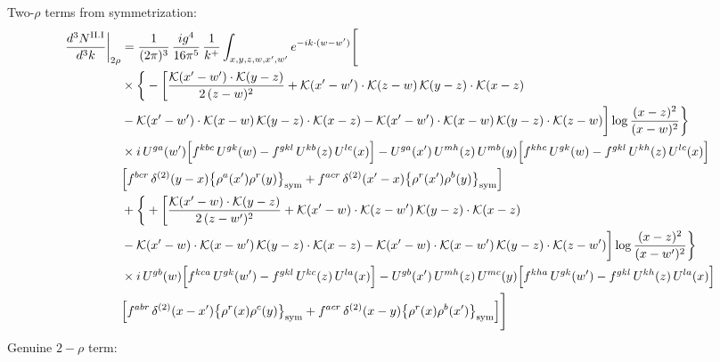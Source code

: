 \documentclass[9pt]{article}
\numberwithin{equation}{section}
\begin{document}
Two-$\rho$ terms from symmetrization: 
\begin{align}
\frac{d^{3}N^{\rm II.I}}{d^{3}k}\bigg|_{2\rho}&=\frac{1}{(2\pi)^{3}}\,\frac{ig^{4}}{16\pi^{5}}\,\frac{1}{k^{+}}\int_{x,y,z,w,x',w'}e^{-ik\cdot{(w-w')}}\Bigg[\notag\\
&\times\bigg\{-\bigg[\frac{\mathcal{K}(x'-w')\cdot\mathcal{K}(y-z)}{2\,(z-w)^{2}}+\mathcal{K}(x'-w')\cdot\mathcal{K}(z-w)\,\mathcal{K}(y-z)\cdot\mathcal{K}(x-z)\notag\\
&-\mathcal{K}(x'-w')\cdot\mathcal{K}(x-w)\,\mathcal{K}(y-z)\cdot\mathcal{K}(x-z)-\mathcal{K}(x'-w')\cdot\mathcal{K}(x-w)\,\mathcal{K}(y-z)\cdot\mathcal{K}(z-w)\bigg]\log\frac{(x-z)^{2}}{(x-w)^{2}}\bigg\}\notag\\
&\times i\,U^{ga}(w')\Big[f^{kbc}\,U^{gk}(w)-f^{gkl}\,U^{kb}(z)\,U^{lc}(x)\Big]-U^{ga}(x')\,U^{mh}(z)\,U^{mb}(y)\Big[f^{khc}\,U^{gk}(w)-f^{gkl}\,U^{kh}(z)\,U^{lc}(x)\Big]\notag \\ & \Big[f^{bcr}\,\delta^{(2)}(y-x)\big\{\rho^{a}(x')\rho^{r}(y)\big\}_{\rm sym} +f^{acr}\,\delta^{(2)}(x'-x)\big\{\rho^{r}(x')\rho^{b}(y)\big\}_{\rm sym}\Big]\notag\\
&+\bigg\{+\bigg[\frac{\mathcal{K}(x'-w)\cdot\mathcal{K}(y-z)}{2\,(z-w')^{2}}+\mathcal{K}(x'-w)\cdot\mathcal{K}(z-w')\,\mathcal{K}(y-z)\cdot\mathcal{K}(x-z)\notag\\
&-\mathcal{K}(x'-w)\cdot\mathcal{K}(x-w')\,\mathcal{K}(y-z)\cdot\mathcal{K}(x-z)-\mathcal{K}(x'-w)\cdot\mathcal{K}(x-w')\,\mathcal{K}(y-z)\cdot\mathcal{K}(z-w')\bigg]\log\frac{(x-z)^{2}}{(x-w')^{2}}\bigg\}\notag\\
&\times i\,U^{gb}(w)\Big[f^{kca}\,U^{gk}(w')-f^{gkl}\,U^{kc}(z)\,U^{la}(x)\Big]-U^{gb}(x')\,U^{mh}(z)\,U^{mc}(y)\Big[f^{kha}\,U^{gk}(w')-f^{gkl}\,U^{kh}(z)\,U^{la}(x)\Big]\notag \\ & \Big[f^{abr}\,\delta^{(2)}(x-x')\big\{\rho^{r}(x)\rho^{c}(y)\big\}_{\rm sym} +f^{acr}\,\delta^{(2)}(x-y)\big\{\rho^{r}(x)\rho^{b}(x')\big\}_{\rm sym}\Big]\Bigg]\label{eq:D-II.I-2}
\end{align}
Genuine $2-\rho$ term:
\end{document}
